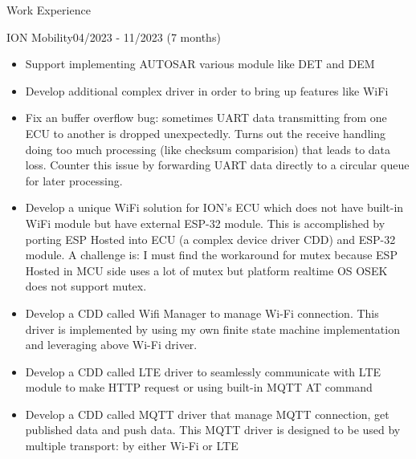\documentclass{resume} %
\begin{document}
\begin{rSection}{Work Experience}
\begin{rCompanySubsection}
        \begin{rProjectSubsubsectionV2}{ION Mobility}{04/2023 - 11/2023 (7 months)}{
            \begin{itemize}
                \item Support implementing AUTOSAR various module like DET and DEM
                \item Develop additional complex driver in order to bring up features like WiFi
            \end{itemize}
        }{
            \begin{itemize}
                \item Fix an buffer overflow bug: sometimes UART data transmitting from one ECU to another is dropped unexpectedly. Turns out the receive handling doing too much processing (like checksum comparision) that leads to data loss. Counter this issue by forwarding UART data directly to a circular queue for later processing.
                \item Develop a unique WiFi solution for ION's ECU which does not have built-in WiFi module but have external ESP-32 module. This is accomplished by porting ESP Hosted into ECU (a complex device driver CDD) and ESP-32 module. A challenge is: I must find the workaround for mutex because ESP Hosted in MCU side uses a lot of mutex but platform realtime OS OSEK does not support mutex.
                \item Develop a CDD called Wifi Manager to manage Wi-Fi connection. This driver is implemented by using my own finite state machine implementation and leveraging above Wi-Fi driver.
                \item Develop a CDD called LTE driver to seamlessly communicate with LTE module to make HTTP request or using built-in MQTT AT command
                \item Develop a CDD called MQTT driver that manage MQTT connection, get published data and push data. This MQTT driver is designed to be used by multiple transport: by either Wi-Fi or LTE
            \end{itemize}
        }
        \end{rProjectSubsubsectionV2}


\end{rCompanySubsection}
\end{rSection}
\end{document}
